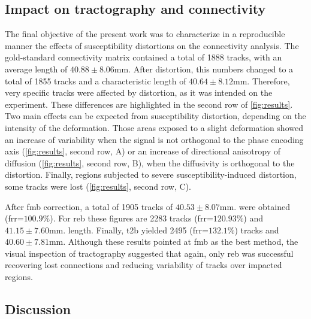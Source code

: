 \subsection{Impact on tractography and connectivity}

The final objective of the present work was to characterize
in a reproducible manner the effects of susceptibility distortions
on the connectivity analysis. The gold-standard connectivity
matrix contained a total of 1888 tracks, with an average
length of $40.88\pm8.06$mm. After distortion, this numbers
changed to a total of 1855 tracks and a characteristic length
of $40.64\pm8.12$mm. Therefore, very specific tracks were affected
by distortion, as it was intended on the experiment. These differences
are highlighted in the second row of \autoref{fig:results}. Two
main effects can be expected from susceptibility distortion,
depending on the intensity of the deformation. Those areas exposed
to a slight deformation showed an increase of variability when
the signal is not orthogonal to the phase encoding axis 
(\autoref{fig:results}, second row, A) or an
increase of directional anisotropy of diffusion
(\autoref{fig:results}, second row, B), when the
diffusivity is orthogonal to the distortion.
Finally, regions subjected to severe susceptibility-induced 
distortion, some tracks were lost (\autoref{fig:results},
second row, C).

After \gls*{fmb} correction, a total of 1905 tracks 
of $40.53\pm8.07$mm. were obtained (\gls*{frr}=$100.9\%$). 
For \gls*{reb} these figures are 2283 tracks (\gls*{frr}=$120.93\%$) 
and $41.15\pm7.60$mm. 
length. Finally, \gls*{t2b} yielded 2495 (\gls*{frr}=$132.1\%$) tracks and 
$40.60\pm7.81$mm. Although these results pointed at
\gls*{fmb} as the best method, the visual inspection
of tractography suggested that again, only \gls*{reb}
was successful recovering lost connections and reducing
variability of tracks over impacted regions. 

\subsection{Discussion}

